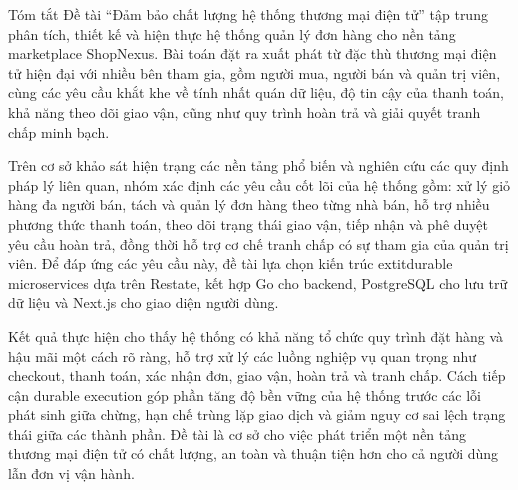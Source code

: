 \begin{preface}{Tóm tắt}
Đề tài ``Đảm bảo chất lượng hệ thống thương mại điện tử'' tập trung phân tích, thiết kế và hiện thực hệ thống quản lý đơn hàng cho nền tảng marketplace ShopNexus. Bài toán đặt ra xuất phát từ đặc thù thương mại điện tử hiện đại với nhiều bên tham gia, gồm người mua, người bán và quản trị viên, cùng các yêu cầu khắt khe về tính nhất quán dữ liệu, độ tin cậy của thanh toán, khả năng theo dõi giao vận, cũng như quy trình hoàn trả và giải quyết tranh chấp minh bạch.

Trên cơ sở khảo sát hiện trạng các nền tảng phổ biến và nghiên cứu các quy định pháp lý liên quan, nhóm xác định các yêu cầu cốt lõi của hệ thống gồm: xử lý giỏ hàng đa người bán, tách và quản lý đơn hàng theo từng nhà bán, hỗ trợ nhiều phương thức thanh toán, theo dõi trạng thái giao vận, tiếp nhận và phê duyệt yêu cầu hoàn trả, đồng thời hỗ trợ cơ chế tranh chấp có sự tham gia của quản trị viên. Để đáp ứng các yêu cầu này, đề tài lựa chọn kiến trúc 	extit{durable microservices} dựa trên Restate, kết hợp Go cho backend, PostgreSQL cho lưu trữ dữ liệu và Next.js cho giao diện người dùng.

Kết quả thực hiện cho thấy hệ thống có khả năng tổ chức quy trình đặt hàng và hậu mãi một cách rõ ràng, hỗ trợ xử lý các luồng nghiệp vụ quan trọng như checkout, thanh toán, xác nhận đơn, giao vận, hoàn trả và tranh chấp. Cách tiếp cận durable execution góp phần tăng độ bền vững của hệ thống trước các lỗi phát sinh giữa chừng, hạn chế trùng lặp giao dịch và giảm nguy cơ sai lệch trạng thái giữa các thành phần. Đề tài là cơ sở cho việc phát triển một nền tảng thương mại điện tử có chất lượng, an toàn và thuận tiện hơn cho cả người dùng lẫn đơn vị vận hành.
\end{preface}
